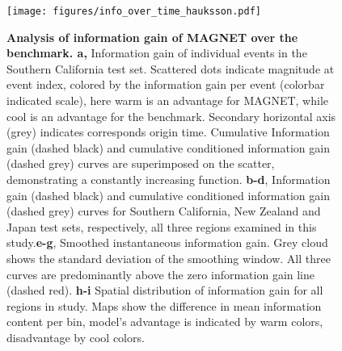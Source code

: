 \documentclass[pdflatex]{sn-jnl}
\begin{document}
   
    
\begin{figure}[h!]
    \centering
    \texttt{[image: figures/info\_over\_time\_hauksson.pdf]}
    \caption{
        \textbf{Analysis of information gain of MAGNET over the benchmark. a,} Information gain of individual events in the Southern California test set. Scattered dots indicate magnitude at event index, colored by the information gain per event (colorbar indicated scale), here warm is an advantage for MAGNET, while cool is an advantage for the benchmark. Secondary horizontal axis (grey) indicates corresponds origin time. Cumulative Information gain (dashed black) and cumulative conditioned information gain (dashed grey) curves are superimposed on the scatter, demonstrating a constantly increasing function. \textbf{b-d}, Information gain (dashed black) and cumulative conditioned information gain (dashed grey) curves for Southern California, New Zealand and Japan test sets, respectively, all three regions examined in this study.\textbf{e-g}, Smoothed instantaneous information gain. Grey cloud shows the standard deviation of the smoothing window. All three curves are predominantly above the zero information gain line (dashed red). \textbf{h-i} Spatial distribution of information gain for all regions in study. Maps show the difference in mean information content per bin, model's advantage is indicated by warm colors, disadvantage by cool colors.
    }
    \label{fig:info_gain_over_time}
\end{figure}
    
\end{document}
